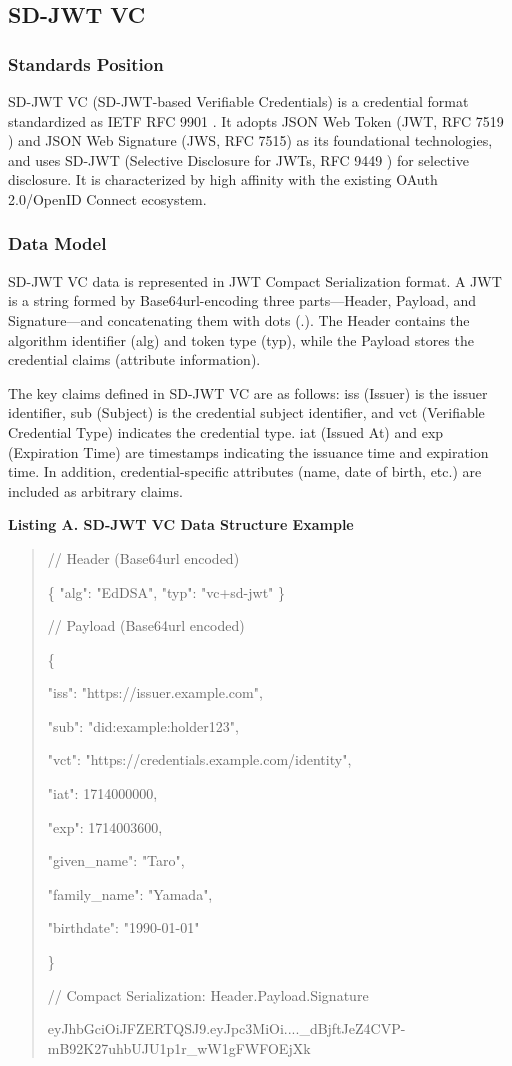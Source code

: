 \documentclass[conference]{IEEEtran}
\begin{document}
\subsection{SD-JWT VC}

\subsubsection{Standards Position}

SD-JWT VC (SD-JWT-based Verifiable Credentials) is a credential format standardized as IETF RFC 9901 \cite{ref1}. It adopts JSON Web Token (JWT, RFC 7519 \cite{ref11}) and JSON Web Signature (JWS, RFC 7515) as its foundational technologies, and uses SD-JWT (Selective Disclosure for JWTs, RFC 9449 \cite{ref7}) for selective disclosure. It is characterized by high affinity with the existing OAuth 2.0/OpenID Connect ecosystem.

\subsubsection{Data Model}

SD-JWT VC data is represented in JWT Compact Serialization format. A JWT is a string formed by Base64url-encoding three parts---Header, Payload, and Signature---and concatenating them with dots (.). The Header contains the algorithm identifier (alg) and token type (typ), while the Payload stores the credential claims (attribute information).

The key claims defined in SD-JWT VC are as follows: iss (Issuer) is the issuer identifier, sub (Subject) is the credential subject identifier, and vct (Verifiable Credential Type) indicates the credential type. iat (Issued At) and exp (Expiration Time) are timestamps indicating the issuance time and expiration time. In addition, credential-specific attributes (name, date of birth, etc.) are included as arbitrary claims.

\textbf{Listing A. SD-JWT VC Data Structure Example}

\begin{quote}
// Header (Base64url encoded)

\{ "alg": "EdDSA", "typ": "vc+sd-jwt" \}

// Payload (Base64url encoded)

\{

"iss": "https://issuer.example.com",

"sub": "did:example:holder123",

"vct": "https://credentials.example.com/identity",

"iat": 1714000000,

"exp": 1714003600,

"given\_name": "Taro",

"family\_name": "Yamada",

"birthdate": "1990-01-01"

\}

// Compact Serialization: Header.Payload.Signature

eyJhbGciOiJFZERTQSJ9.eyJpc3MiOi....\_dBjftJeZ4CVP-mB92K27uhbUJU1p1r\_wW1gFWFOEjXk
\end{quote}
\end{document}
